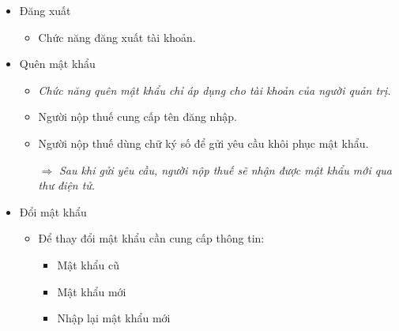 \begin{itemize}
\begin{itemize}
\begin{itemize}
                        \end{itemize}

                  \item Đăng xuất

                        \begin{itemize}

                              \item Chức năng đăng xuất tài khoản.

                        \end{itemize}

                  \item Quên mật khẩu

                        \begin{itemize}

                              \item \emph{Chức năng quên mật khẩu chỉ áp dụng cho tài khoản của người quản trị.}

                              \item Người nộp thuế cung cấp tên đăng nhập.

                              \item Người nộp thuế dùng chữ ký số để gửi yêu cầu khôi phục mật khẩu.

                                    $\Rightarrow$ \emph{Sau khi gửi yêu cầu, người nộp thuế sẽ nhận được mật khẩu mới qua thư điện tử.}    %

                        \end{itemize}

                  \item Đổi mật khẩu

                        \begin{itemize}

                              \item Để thay đổi mật khẩu cần cung cấp thông tin:

                                    \begin{itemize}

                                          \item Mật khẩu cũ

                                          \item Mật khẩu mới

                                          \item Nhập lại mật khẩu mới


\end{itemize}
\end{itemize}
\end{itemize}
\end{itemize}
